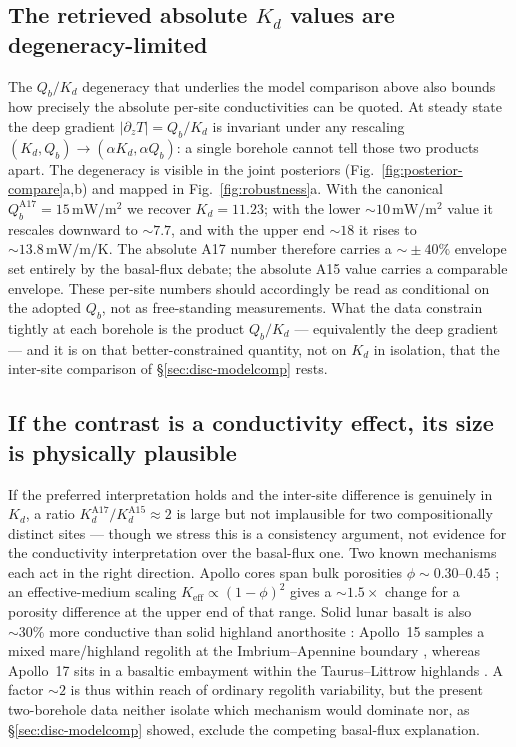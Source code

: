 \documentclass[11pt]{article}
\begin{document}
\subsection{The retrieved absolute $K_d$ values are degeneracy-limited}
The $Q_b/K_d$ degeneracy that underlies the model comparison above
also bounds how precisely the absolute per-site conductivities
can be quoted. At steady state the deep gradient
$|\partial_z T|\!=\!Q_b/K_d$ is invariant under any rescaling
$(K_d,Q_b)\!\to\!(\alpha K_d,\alpha Q_b)$: a single borehole cannot
tell those two products apart. The degeneracy is visible in the joint
posteriors (Fig.~\ref{fig:posterior-compare}a,b) and mapped in
Fig.~\ref{fig:robustness}a. With the canonical
$Q_b^{\mathrm{A17}}=15\,\si{\milli\watt\per\meter\squared}$
\citep{langseth1976,nagihara2018} we recover $K_d=11.23$; with the
lower $\sim\!10\,\si{\milli\watt\per\meter\squared}$
\citet{saito2007,nagihara2018} value it rescales downward to
$\sim\!7.7$, and with the upper end $\sim\!18$ it rises to
$\sim\!13.8\,\si{\milli\watt\per\meter\per\kelvin}$. The absolute A17
number therefore carries a $\sim\!\pm 40\%$ envelope set entirely by
the basal-flux debate; the absolute A15 value carries a comparable
envelope. These per-site numbers should accordingly be read as
conditional on the adopted $Q_b$, not as free-standing
measurements. What the data constrain tightly at each borehole is the
product $Q_b/K_d$ --- equivalently the deep gradient --- and it is on
that better-constrained quantity, not on $K_d$ in isolation, that the
inter-site comparison of \S\ref{sec:disc-modelcomp} rests.

\subsection{If the contrast is a conductivity effect, its size is
physically plausible}
If the preferred interpretation holds and the inter-site
difference is genuinely in $K_d$, a ratio
$K_d^{\mathrm{A17}}/K_d^{\mathrm{A15}}\!\approx\!2$ is large but not
implausible for two compositionally distinct sites --- though we
stress this is a consistency argument, not evidence for the
conductivity interpretation over the basal-flux one. Two known
mechanisms each act in the right direction. Apollo cores span bulk
porosities $\phi\!\sim\!0.30$--$0.45$ \citep{mitchell1973,carrier1991};
an effective-medium scaling $K_\mathrm{eff}\!\propto\!(1-\phi)^2$
\citep{wood2020} gives a $\sim\!1.5\times$ change for a porosity
difference at the upper end of that range. Solid lunar basalt is also
$\sim\!30\%$ more conductive than solid highland anorthosite
\citep{horai1972}: Apollo~15 samples a mixed mare/highland regolith
at the Imbrium--Apennine boundary \citep{korotev2005,wieczorek2006},
whereas Apollo~17 sits in a basaltic embayment within the
Taurus--Littrow highlands \citep{crawford2015}. A factor $\sim\!2$ is
thus within reach of ordinary regolith variability, but the present
two-borehole data neither isolate which mechanism would dominate nor,
as \S\ref{sec:disc-modelcomp} showed, exclude the competing
basal-flux explanation.
\end{document}
